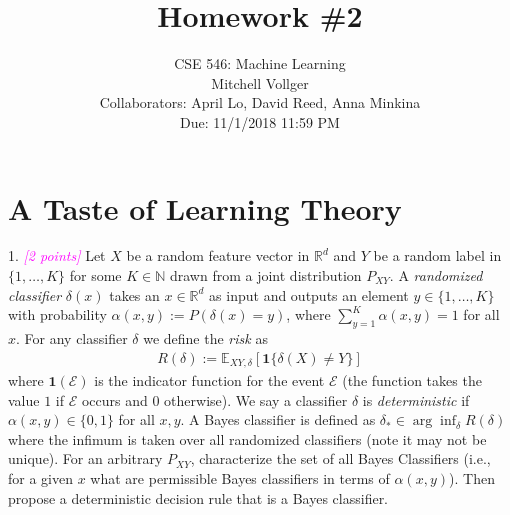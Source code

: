 \documentclass{article}
\date{{}}
\newcommand{\field}[1]{\mathbb{#1}}
\newcommand{\1}{\mathbf{1}}
\newcommand{\E}{\mathbb{E}} %
\newcommand{\R}{\field{R}} %
\newcommand{\grade}[1]{\small\textcolor{magenta}{\emph{[#1 points]}} \normalsize}
\begin{document}
\title{Homework \#2}
\author{\normalsize{CSE 546: Machine Learning}\\
\normalsize{Mitchell Vollger} \\
\normalsize{Collaborators: April Lo, David Reed, Anna Minkina} \\
\normalsize{Due: 11/1/2018  11:59 PM}}
\maketitle

\section{A Taste of Learning Theory}
1. \grade{2}
Let $X$ be a random feature vector in $\R^d$ and $Y$ be a random label in $\{1,\dots,K\}$ for some $K \in \mathbb{N}$ drawn from a joint distribution $P_{XY}$. 
A \emph{randomized classifier} $\delta(x)$ takes an $x\in \R^d$ as input and outputs an element $y \in \{1,\dots,K\}$ with probability $\alpha(x,y) := P(\delta(x) = y)$, where $\sum_{y=1}^K \alpha(x,y) = 1$ for all $x$.
For any classifier $\delta$ we define the \emph{risk} as
\begin{align*}
R(\delta) := \E_{XY,\delta}[ \1\{ \delta(X) \neq Y \}]
\end{align*}
where $\1(\mathcal{E})$ is the indicator function for the event $\mathcal{E}$ (the
function takes the value $1$ if $\mathcal{E}$ occurs and $0$ otherwise).
We say a classifier $\delta$ is \emph{deterministic} if $\alpha(x,y) \in \{0,1\}$ for all $x,y$.
A Bayes classifier is defined as $\delta_* \in \arg\inf_\delta R(\delta)$ where the infimum is taken over all randomized classifiers (note it may not be unique). 
For an arbitrary $P_{XY}$, characterize the set of all Bayes Classifiers (i.e., for a given $x$ what are permissible Bayes classifiers in terms of $\alpha(x,y)$).
Then propose a deterministic decision rule that is a Bayes classifier.\\
\end{document}
